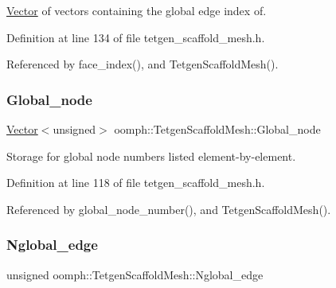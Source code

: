 \hyperlink{classoomph_1_1Vector}{Vector} of vectors containing the global edge index of. 



Definition at line 134 of file tetgen\+\_\+scaffold\+\_\+mesh.\+h.



Referenced by face\+\_\+index(), and Tetgen\+Scaffold\+Mesh().

\mbox{\label{classoomph_1_1TetgenScaffoldMesh_ada16a9ad5226a937365e6d88e40e7af4}} 
\subsubsection{\texorpdfstring{Global\+\_\+node}{Global\_node}}
{\footnotesize\ttfamily \hyperlink{classoomph_1_1Vector}{Vector}$<$unsigned$>$ oomph\+::\+Tetgen\+Scaffold\+Mesh\+::\+Global\+\_\+node\hspace{0.3cm}{\ttfamily [protected]}}



Storage for global node numbers listed element-\/by-\/element. 



Definition at line 118 of file tetgen\+\_\+scaffold\+\_\+mesh.\+h.



Referenced by global\+\_\+node\+\_\+number(), and Tetgen\+Scaffold\+Mesh().

\mbox{\label{classoomph_1_1TetgenScaffoldMesh_aafa53fcb1ac09cc8667783a0d514def3}} 
\subsubsection{\texorpdfstring{Nglobal\+\_\+edge}{Nglobal\_edge}}
{\footnotesize\ttfamily unsigned oomph\+::\+Tetgen\+Scaffold\+Mesh\+::\+Nglobal\+\_\+edge\hspace{0.3cm}{\ttfamily [protected]}}



